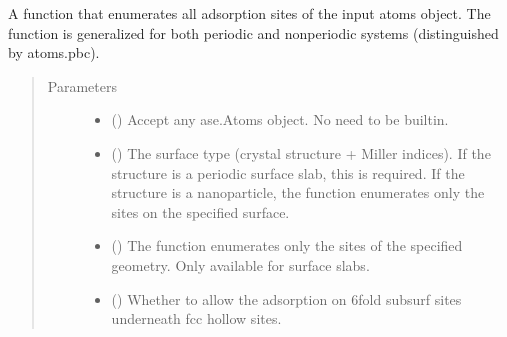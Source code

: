 \documentclass[letterpaper,10pt,english]{sphinxmanual}
\begin{document}
\begin{fulllineitems}
\label{\detokenize{modules:acat.adsorption_sites.enumerate_adsorption_sites}}
A function that enumerates all adsorption sites of the
input atoms object. The function is generalized for both
periodic and non\sphinxhyphen{}periodic systems (distinguished by atoms.pbc).
\begin{quote}\begin{description}
\item[{Parameters}] \leavevmode\begin{itemize}
\item {} 
 () \textendash{} Accept any ase.Atoms object. No need to be built\sphinxhyphen{}in.

\item {} 
 (\sphinxstyleliteralemphasis{\sphinxupquote{, }}) \textendash{} The surface type (crystal structure + Miller indices).
If the structure is a periodic surface slab, this is required.
If the structure is a nanoparticle, the function enumerates
only the sites on the specified surface.

\item {} 
 (\sphinxstyleliteralemphasis{\sphinxupquote{, }}) \textendash{} The function enumerates only the sites of the specified
geometry. Only available for surface slabs.

\item {} 
 (\sphinxstyleliteralemphasis{\sphinxupquote{, }}) \textendash{} Whether to allow the adsorption on 6\sphinxhyphen{}fold subsurf sites
underneath fcc hollow sites.


\end{itemize}
\end{description}
\end{quote}
\end{fulllineitems}
\end{document}
